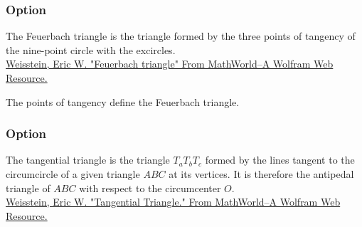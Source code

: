 \subsubsection{Option }
The Feuerbach triangle is the triangle formed by the three points of tangency of the nine-point circle with the excircles.\\
\href{http://mathworld.wolfram.com/FeuerbachTriangle.html}{Weisstein, Eric W. "Feuerbach triangle" From MathWorld--A Wolfram Web Resource.}

 The points of tangency define the Feuerbach triangle.

\begin{tkzexample}[latex=8cm,small]
\end{tkzexample}

\subsubsection{Option   } 
The tangential triangle is the triangle $T_aT_bT_c$ formed by the lines tangent to the circumcircle of a given triangle $ABC$ at its vertices. It is therefore the antipedal triangle of $ABC$ with respect to the circumcenter $O$.\\ 
\href{http://mathworld.wolfram.com/TangentialTriangle.html}{Weisstein, Eric W. "Tangential Triangle." From MathWorld--A Wolfram Web Resource. }


\begin{tkzexample}[latex=8cm,small]
\end{tkzexample} 

